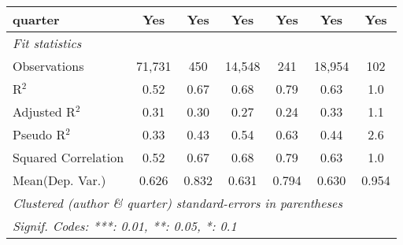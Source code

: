 \begin{tabular}{lcccccc}
   quarter                                                    & Yes           & Yes            & Yes     & Yes           & Yes            & Yes\\  
   \midrule
   \emph{Fit statistics}\\
   Observations                                               & 71,731        & 450            & 14,548  & 241           & 18,954         & 102\\  
   R$^2$                                                      & 0.52          & 0.67           & 0.68    & 0.79          & 0.63           & 1.0\\  
   Adjusted R$^2$                                             & 0.31          & 0.30           & 0.27    & 0.24          & 0.33           & 1.1\\  
   Pseudo R$^2$                                               & 0.33          & 0.43           & 0.54    & 0.63          & 0.44           & 2.6\\  
   Squared Correlation                                        & 0.52          & 0.67           & 0.68    & 0.79          & 0.63           & 1.0\\  
Mean(Dep. Var.) & 0.626 & 0.832 & 0.631 & 0.794 & 0.630 & 0.954 \\
   \midrule \midrule
   \multicolumn{7}{l}{\emph{Clustered (author \& quarter) standard-errors in parentheses}}\\
   \multicolumn{7}{l}{\emph{Signif. Codes: ***: 0.01, **: 0.05, *: 0.1}}\\
\end{tabular}
\par\endgroup
